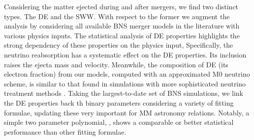Considering the matter ejected during and after mergers, we find 
two distinct types. The \ac{DE} and the \pmerg{} \ac{SWW}. 
With respect to the former 
we augment the analysis by considering all 
available \ac{BNS} merger models in the literature with various physics inputs. 
The statistical analysis of \ac{DE} properties highlights the strong 
dependency of these properties on the physics input, 
Specifically, the neutrino reabsorption has a systematic effect on the 
\ac{DE} properties. Its inclusion raises the ejecta mass and velocity. 
Meanwhile, the composition of \ac{DE} (its electron fraction) 
from our models, computed with an approximated M0 neutrino scheme, 
is similar to that found in simulations with more sophisticated neutrino treatment 
methods \citep{Sekiguchi:2016bjd,Vincent:2019kor}. 
Taking the largest-to-date set of \ac{BNS} simulations, we link the \ac{DE} properties 
back th binary parameters considering a variety of fitting formulae, updating 
these very important for \ac{MM} astronomy relations. 
Notably, a simple two parameter polynomial, \polql{}, shows a comparable or 
better statistical performance than other fitting formulae.

%
%


